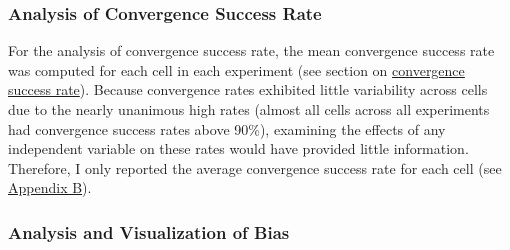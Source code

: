 \documentclass[
12pt, %
twoside,
english]{guelphthesis}
\theoremstyle{definition}
\theoremstyle{definition}
\theoremstyle{definition}
\theoremstyle{definition}
\theoremstyle{remark}
\begin{document}
\hypertarget{convergence-analysis}{%
\subsubsection{Analysis of Convergence Success Rate}\label{convergence-analysis}}

For the analysis of convergence success rate, the mean convergence success rate was computed for each cell in each experiment (see section on \protect\hyperlink{convergence}{convergence success rate}). Because convergence rates exhibited little
variability across cells due to the nearly unanimous high rates (almost all cells across all experiments had convergence success rates above 90\%), examining the effects of any independent variable on these rates would have provided little information. Therefore, I only reported the average convergence success rate for each cell (see \protect\hyperlink{appendix-a-convergence-rates}{Appendix B}).

\hypertarget{bias-analysis}{%
\subsubsection{Analysis and Visualization of Bias}\label{bias-analysis}}
\end{document}
